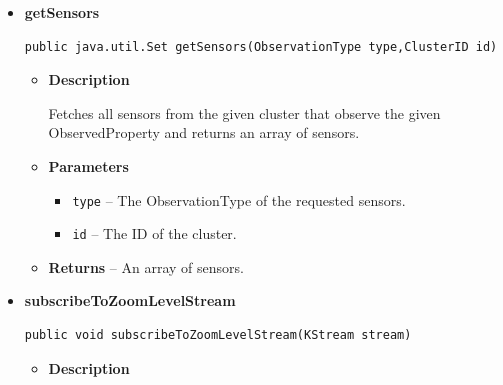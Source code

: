 {{{{{{\begin{itemize}
{\begin{itemize}
{Returns an appropriate grid of clusters in the requested grid section for the specified ZoomLevel and time. The (first) two values of the ClusterID array define the grid section from which to get the data.
}
\item{
{\bf  Parameters}
  \begin{itemize}
   \item{
\texttt{clusters} -- An array of ClusterIDs from which the first two entries are taken to compute the section of the Grid to get the data from.}
   \item{
\texttt{zoom} -- The ZoomLevel from which to get the data.}
   \item{
\texttt{time} -- The point in time.}
  \end{itemize}
}%
\item{{\bf  Returns} --
A grid with the computed data.
}%
\end{itemize}
}%
\item{
\hypertarget{DatabaseConnection.Facade.getSensors(ObservationType, DatabaseConnection.ClusterID)}{{\bf  getSensors}\\}
\begin{lstlisting}[frame=none]
public java.util.Set getSensors(ObservationType type,ClusterID id)\end{lstlisting} %
\begin{itemize}
\item{
{\bf  Description}

Fetches all sensors from the given cluster that observe the given ObservedProperty and returns an array of sensors.
}
\item{
{\bf  Parameters}
  \begin{itemize}
   \item{
\texttt{type} -- The ObservationType of the requested sensors.}
   \item{
\texttt{id} -- The ID of the cluster.}
  \end{itemize}
}%
\item{{\bf  Returns} --
An array of sensors.
}%
\end{itemize}
}%
\item{
\hypertarget{DatabaseConnection.Facade.subscribeToZoomLevelStream(KStream)}{{\bf  subscribeToZoomLevelStream}\\}
\begin{lstlisting}[frame=none]
public void subscribeToZoomLevelStream(KStream stream)\end{lstlisting} %
\begin{itemize}
\item{
{\bf  Description}

}
\end{itemize}}
\end{itemize}}}}}}}
